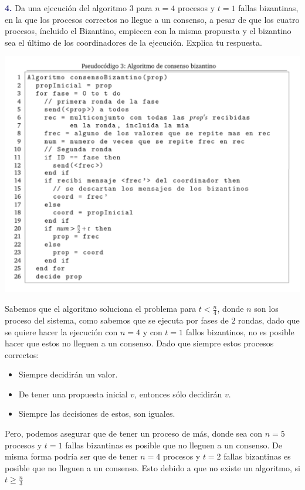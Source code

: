 \newpage
\textbf{\textcolor{MidnightBlue}{4.}} Da una ejecución del algoritmo 3 para $n=4$ procesos y
$t=1$ fallas bizantinas, en la que los procesos correctos no llegue a un consenso, a pesar de
que los cuatro procesos, íncluido el Bizantino, empiecen con la misma propuesta y el bizantino
sea el último de los coordinadores de la ejecución. Explica tu respuesta.

\begin{center}
    \includegraphics[scale=0.35]{consensoBizantino.png}
    \end{center}

Sabemos que el algoritmo soluciona el problema para $t<\frac{n}{4}$, donde $n$ son los proceso del
sistema, como sabemos que se ejecuta por fases de $2$ rondas, dado que se quiere hacer la ejecución
con $n=4$ y con $t=1$ fallos bizantinos, no es posible hacer que estos no lleguen a un consenso.
Dado que siempre estos procesos correctos:
\begin{itemize}
    \item Siempre decidirán un valor.
    \item De tener una propuesta inicial $v$, entonces sólo decidirán $v$.
    \item Siempre las decisiones de estos, son iguales.
\end{itemize}

Pero, podemos asegurar que de tener un proceso de más, donde sea con $n=5$ procesos y $t=1$ fallas
bizantinas es posible que no lleguen a un consenso. De misma forma podría ser que de tener $n=4$
procesos y $t=2$ fallas bizantinas es posible que no lleguen a un consenso. Esto debido a que no
existe un algoritmo, si $t\geq \frac{n}{3}$\\

